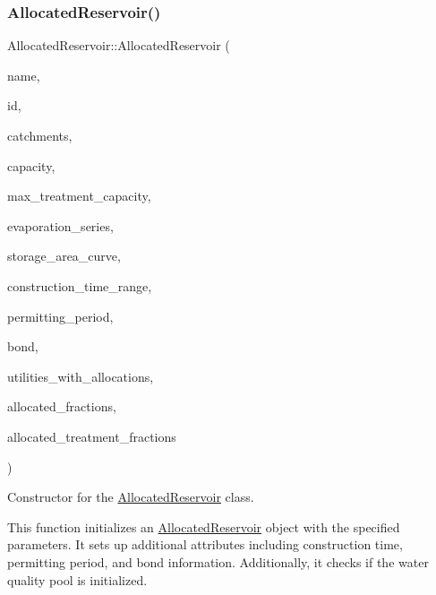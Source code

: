 \subsubsection{\texorpdfstring{Allocated\+Reservoir()}{AllocatedReservoir()}\hspace{0.1cm}{\footnotesize\ttfamily [2/5]}}
{\footnotesize\ttfamily Allocated\+Reservoir\+::\+Allocated\+Reservoir (\begin{DoxyParamCaption}\item[{const char $\ast$}]{name,  }\item[{const int}]{id,  }\item[{const vector$<$ \mbox{\hyperlink{classCatchment}{Catchment}} $\ast$$>$ \&}]{catchments,  }\item[{const double}]{capacity,  }\item[{const double}]{max\+\_\+treatment\+\_\+capacity,  }\item[{Evaporation\+Series \&}]{evaporation\+\_\+series,  }\item[{Data\+Series $\ast$}]{storage\+\_\+area\+\_\+curve,  }\item[{const vector$<$ double $>$ \&}]{construction\+\_\+time\+\_\+range,  }\item[{double}]{permitting\+\_\+period,  }\item[{\mbox{\hyperlink{classBond}{Bond}} \&}]{bond,  }\item[{vector$<$ int $>$ $\ast$}]{utilities\+\_\+with\+\_\+allocations,  }\item[{vector$<$ double $>$ $\ast$}]{allocated\+\_\+fractions,  }\item[{vector$<$ double $>$ $\ast$}]{allocated\+\_\+treatment\+\_\+fractions }\end{DoxyParamCaption})}



Constructor for the \mbox{\hyperlink{classAllocatedReservoir}{Allocated\+Reservoir}} class. 

This function initializes an \mbox{\hyperlink{classAllocatedReservoir}{Allocated\+Reservoir}} object with the specified parameters. It sets up additional attributes including construction time, permitting period, and bond information. Additionally, it checks if the water quality pool is initialized.


